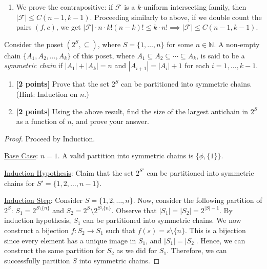 \documentclass[12pt,answers]{exam}
\begin{document}
\begin{questions}
\begin{solution}
\begin{enumerate}
    \item We prove the contrapositive: if $\mathcal{F}$ is a $k$-uniform intersecting family, then $|\mathcal{F}| \le C(n-1,k-1)$. Proceeding similarly to above, if we double count the pairs $(f,c)$, we get $|\mathcal{F}| \cdot n \cdot k!(n-k)! \le k \cdot n! \implies |\mathcal{F}| \le C(n-1,k-1)$.
\end{enumerate} 
\end{solution}

\question Consider the poset $(2^S,\subseteq)$, where $S=\{1,\ldots,n\}$ for some $n\in\mathbb{N}$. A non-empty chain $\{A_1,A_2,\ldots,A_k\}$ of this poset, where $A_1\subseteq A_2\subseteq\cdots\subseteq A_k$, is said to be a \textit{symmetric chain} if $|A_1|+|A_k|=n$ and $|A_{i+1}|=|A_i|+1$ for each $i=1,\ldots,k-1$.
\begin{enumerate}
\item\textbf{[2 points]} Prove that the set $2^S$ can be partitioned into symmetric chains. (Hint: Induction on $n$.)
\item\textbf{[2 points]} Using the above result, find the size of the largest antichain in $2^S$ as a function of $n$, and prove your answer.
\end{enumerate}

\begin{solution}
\begin{enumerate}
    {\item \begin{proof} Proceed by Induction.
    
    \underline{Base Case}: $n=1$. A valid partition into symmetric chains is $\{\phi,\{1\}\}$.
    
    \underline{Induction Hypothesis}: Claim that the set $2^{S'}$ can be partitioned into symmetric chains for $S' = \{1,2,\ldots,n-1\}$.
    
    \underline{Induction Step}: Consider $S = \{1,2,\ldots,n\}$. Now, consider the following partition of $2^S$: $S_1 = 2^{S\setminus \{n\}}$ and $S_2 = 2^S \setminus 2^{S\setminus \{n\}}$. Observe that $|S_1| = |S_2| = 2^{|S|-1}$. By induction hypothesis, $S_1$ can be partitioned into symmetric chains. We now construct a bijection $f:S_2 \to S_1$ such that $f(s) = s \setminus \{n\}$. This is a bijection since every element has a unique image in $S_1$, and $|S_1| = |S_2|$. Hence, we can construct the same partition for $S_2$ as we did for $S_1$. Therefore, we can successfully partition $S$ into symmetric chains.\end{proof}}
    

\end{enumerate}
\end{solution}
\end{questions}
\end{document}
